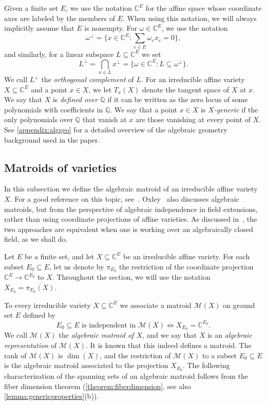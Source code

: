 \documentclass[11pt,a4paper,dvipsnames]{scrartcl}
\theoremstyle{definition}
\newcommand{\CC}{\mathbb{C}}
\newcommand{\QQ}{\mathbb{Q}}
\newcommand{\algmat}[1]{\mathcal{M}(#1)}
\begin{document}
Given a finite set $E$, we use the notation $\CC^E$ for the affine space whose coordinate axes are labeled by the members of $E$. When using this notation, we will always implicitly assume that $E$ is nonempty. 
For  $\omega \in \CC^E$, we use the notation
\[\omega^\perp = \{x \in \CC^E: \sum_{e \in E} \omega_e x_e = 0\},\]
and similarly, for a linear subspace $L \subseteq \CC^E$ we set
\[L^\perp = \bigcap_{x \in L} x^\perp = \{\omega \in \CC^E : L \subseteq \omega^\perp\}.\]
We call $L^\perp$ the \emph{orthogonal complement} of $L$.
For an irreducible affine variety $X \subseteq \CC^E$ and a point $x \in X$, we let $T_x(X)$ denote the tangent space of $X$ at $x$. We say that $X$ is \emph{defined over $\QQ$} if it can be written as the zero locus of some polynomials with coefficients in $\QQ$. We say that a point $x \in X$ is \emph{$X$-generic} if the only polynomials over $\QQ$ that vanish at $x$ are those vanishing at every point of $X$. See \cref{appendix:alggeo} for a detailed overview of the algebraic geometry background used in the paper. 

\subsection{Matroids of varieties}\label{subsection:algmatroids}

In this subsection we define the algebraic matroid of an irreducible affine variety $X$. For a good reference on this topic, see~\cite{rosen.etal_2020}. Oxley~\cite[Section 6.7]{oxley_2011} also discusses algebraic matroids, but from the perspective of algebraic independence in field extensions, rather than using coordinate projections of affine varieties. As discussed in~\cite{rosen.etal_2020}, the two approaches are equivalent when one is working over an algebraically closed field, as we shall do.

Let $E$ be a finite set, and let $X \subseteq \CC^E$ be an irreducible affine variety. For each subset $E_0 \subseteq E$, let us denote by $\pi_{E_0}$ the restriction of the coordinate projection  $\CC^E \rightarrow \CC^{E_0}$ to $X$. Throughout the section, we will use the notation $X_{E_0} = \overline{\pi_{E_0}(X)}$.

To every irreducible variety $X \subseteq \CC^E$ we associate a matroid $\algmat{X}$ on ground set $E$ defined by
\[E_0 \subseteq E \text{ is independent in } \algmat{X} \Longleftrightarrow X_{E_0} = \CC^{E_0}.\] We call $\algmat{X}$ the \emph{algebraic matroid of $X$}, and we say that $X$ is an \emph{algebraic representation} of $\algmat{X}$. It is known that this indeed defines a matroid. The rank of $\algmat{X}$ is $\dim(X)$, and the restriction of $\algmat{X}$ to a subset $E_0 \subseteq E$ is the algebraic matroid associated to the projection $X_{E_0}$. The following characterization of the spanning sets of an algebraic matroid follows from the fiber dimension theorem (\cref{theorem:fiberdimension}, see also \cref{lemma:genericproperties}(b)).
\end{document}
